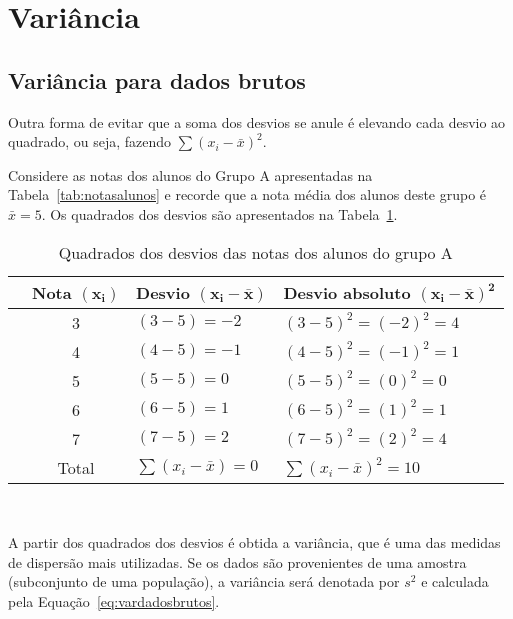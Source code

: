 \documentclass[11pt,fleqn]{book} %
\begin{document}

\section{Variância}

\subsection{Variância para dados brutos}

Outra forma de evitar que a soma dos desvios se anule é elevando cada desvio ao quadrado, ou seja, fazendo $\sum(x_i-\bar{x})^2$. \\

\begin{example}

Considere as notas dos alunos do Grupo A apresentadas na Tabela~\ref{tab:notasalunos} e recorde que a nota média dos alunos deste grupo é $\bar{x}=5$. Os quadrados dos desvios são apresentados na Tabela~\ref{tab:vardadosbrutos}.

\begin{table}[h]
	\caption{Quadrados dos desvios das notas dos alunos do grupo A}
	\label{tab:vardadosbrutos} 
	\vspace{-0.1cm}
	\centering
	\begin{tabular}{l c l l}
	\toprule
	& \textbf{Nota $\bm{(x_i)}$} & \textbf{Desvio $\bm{(x_i-\bar{x})}$} & \textbf{Desvio absoluto $\bm{(x_i-\bar{x})^2}$} \\
	\midrule
	& 3 & $(3-5)=-2$ & $(3-5)^2=(-2)^2=4$ \\
	& 4 & $(4-5)=-1$ & $(4-5)^2=(-1)^2=1$ \\
	& 5 & $(5-5)=0$  & $(5-5)^2=(0)^2=0$ \\
	& 6 & $(6-5)=1$  & $(6-5)^2=(1)^2=1$ \\
	& 7 & $(7-5)=2$  & $(7-5)^2=(2)^2=4$ \\
	\hline
	& Total & $\sum(x_i-\bar{x})=0$ & $\sum(x_i-\bar{x})^2=10$ \\
	\bottomrule
	\end{tabular} \\
\end{table}

\end{example}

\vspace{0,3cm}


A partir dos quadrados dos desvios é obtida a variância, que é uma das medidas de dispersão mais utilizadas. Se os dados são provenientes de uma amostra (subconjunto de uma população), a variância será denotada por $s^2$ e calculada pela Equação~\ref{eq:vardadosbrutos}. \\
\end{document}
